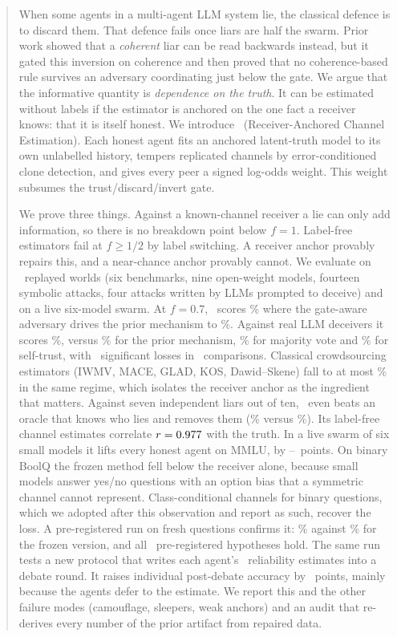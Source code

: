 \begin{abstract}
When some agents in a multi-agent LLM system lie, the classical defence is to discard them. That defence fails once liars are half the swarm. Prior work showed that a \emph{coherent} liar can be read backwards instead, but it gated this inversion on coherence and then proved that no coherence-based rule survives an adversary coordinating just below the gate. We argue that the informative quantity is \emph{dependence on the truth}. It can be estimated without labels if the estimator is anchored on the one fact a receiver knows: that it is itself honest. We introduce \race\ (Receiver-Anchored Channel Estimation). Each honest agent fits an anchored latent-truth model to its own unlabelled history, tempers replicated channels by error-conditioned clone detection, and gives every peer a signed log-odds weight. This weight subsumes the trust/discard/invert gate.

We prove three things. Against a known-channel receiver a lie can only add information, so there is no breakdown point below $f=1$. Label-free estimators fail at $f\ge1/2$ by label switching. A receiver anchor provably repairs this, and a near-chance anchor provably cannot. We evaluate on \nWorldsReplay\ replayed worlds (six benchmarks, nine open-weight models, fourteen symbolic attacks, four attacks written by LLMs prompted to deceive) and on a live six-model swarm. At $f=0.7$, \race\ scores \zooGateRaceSeven\% where the gate-aware adversary drives the prior mechanism to \zooGateAipSeven\%. Against real LLM deceivers it scores \llmRaceSeven\%, versus \llmAipSeven\% for the prior mechanism, \llmMajSeven\% for majority vote and \llmSelfSeven\% for self-trust, with \llmLosses\ significant losses in \llmCells\ comparisons. Classical crowdsourcing estimators (IWMV, MACE, GLAD, KOS, Dawid--Skene) fall to at most \crowdClassicalMaxSeven\% in the same regime, which isolates the receiver anchor as the ingredient that matters. Against seven independent liars out of ten, \race\ even beats an oracle that knows who lies and removes them (\extRaceIndepSeven\% versus \extRemovalIndepSeven\%). Its label-free channel estimates correlate $r=\chanCorr$ with the truth. In a live swarm of six small models it lifts every honest agent on MMLU, by \liveMmluGainMin--\liveMmluGainMax\ points. On binary BoolQ the frozen method fell below the receiver alone, because small models answer yes/no questions with an option bias that a symmetric channel cannot represent. Class-conditional channels for binary questions, which we adopted after this observation and report as such, recover the loss. A pre-registered run on fresh questions confirms it: \hypHOneATarget\% against \hypHOneABase\% for the frozen version, and all \hypSupported\ pre-registered hypotheses hold. The same run tests a new protocol that writes each agent's \race\ reliability estimates into a debate round. It raises individual post-debate accuracy by \informedDelta\ points, mainly because the agents defer to the estimate. We report this and the other failure modes (camouflage, sleepers, weak anchors) and an audit that re-derives every number of the prior artifact from repaired data.
\end{abstract}
